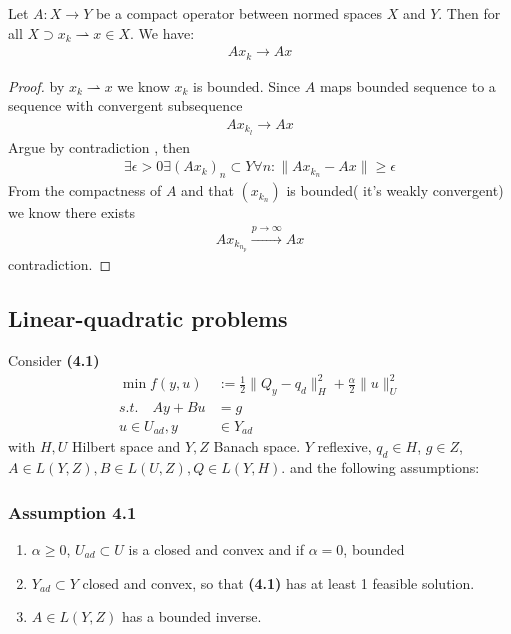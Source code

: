 \begin{lemma}
	Let $A: X \rightarrow Y$ be a compact operator between normed spaces $X$ and $Y$. Then for all $X \supset x_k \rightharpoonup x \in X$. We have:
	\begin{align*}
		Ax_k \rightarrow Ax
	\end{align*}
\end{lemma}
\begin{proof}
	by $x_k \rightharpoonup x$ we know $x_k$ is bounded. Since $A$ maps bounded sequence to a sequence with convergent subsequence
	\begin{align*}
		Ax_{k_l} \rightarrow Ax
	\end{align*} 
	Argue by contradiction , then 
	\begin{align*}
		\exists \epsilon > 0 \exists (Ax_k)_n \subset Y \forall n : \|Ax_{k_n} - Ax \| \ge \epsilon
	\end{align*}
	From the compactness of $A$ and that $(x_{k_n})$ is bounded( it's weakly convergent) we know there exists
	\begin{align*}
		Ax_{k_{n_p}} \overset{p \rightarrow \infty}{\rightarrow} Ax
	\end{align*}
	contradiction. 
\end{proof}

\subsection{Linear-quadratic problems}
Consider \textbf{(4.1)}
\begin{align*}
	\min f(y, u) &:= \frac{1}{2}\|Q_y - q_d \|_H^2 + \frac{\alpha}{2}\|u\|_U^2\\
	s.t. \quad Ay + Bu &= g\\
	u \in U_{ad}, y &\in Y_{ad}
\end{align*}
with $H, U$ Hilbert space and $Y, Z$ Banach space. $Y$ reflexive, $q_d \in H$, $g \in Z$, $A \in L(Y, Z), B \in L(U, Z), Q \in L(Y, H)$. and the following assumptions:

\subsubsection*{Assumption 4.1}
\begin{enumerate}
	\item $\alpha \geq 0$, $U_{ad} \subset U$ is a closed and convex and if $\alpha = 0$, bounded
	\item $Y_{ad} \subset Y$ closed and convex, so that \textbf{(4.1)} has at least 1 feasible solution. 
	\item $A \in L(Y, Z)$ has a bounded inverse. 
\end{enumerate} 

